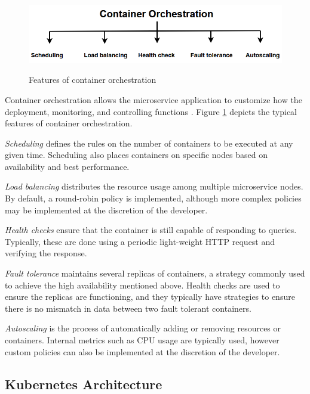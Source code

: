 \begin{figure}[htb]
    \centering
    \caption{Features of container orchestration}
    \includegraphics[width=0.9\linewidth]{Figures/Container-Orchestration.png}
    \label{fig:container-orchestration}
\end{figure}

Container orchestration allows the microservice application to customize how the deployment, monitoring, and controlling functions \cite{casalicchio2019container}. Figure \ref{fig:container-orchestration} depicts the typical features of container orchestration.\par
\textit{Scheduling} defines the rules on the number of containers to be executed at any given time. Scheduling also places containers on specific nodes based on availability and best performance.\par
\textit{Load balancing} distributes the resource usage among multiple microservice nodes. By default, a round-robin policy is implemented, although more complex policies may be implemented at the discretion of the developer.\par
\textit{Health checks} ensure that the container is still capable of responding to queries. Typically, these are done using a periodic light-weight HTTP request and verifying the response.\par
\textit{Fault tolerance} maintains several replicas of containers, a strategy commonly used to achieve the high availability mentioned above. Health checks are used to ensure the replicas are functioning, and they typically have strategies to ensure there is no mismatch in data between two fault tolerant containers.\par
\textit{Autoscaling} is the process of automatically adding or removing resources or containers. Internal metrics such as CPU usage are typically used, however custom policies can also be implemented at the discretion of the developer.\par

\subsection{Kubernetes Architecture}
\label{subsec:k8s-overview}

